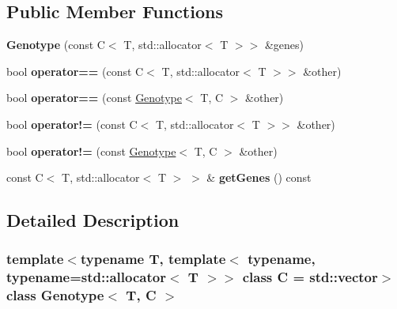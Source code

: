 \subsection*{Public Member Functions}
\begin{DoxyCompactItemize}
\item 
\hypertarget{classGenotype_aa017324ebf3698c5f109df27abbaae2a}{{\bfseries Genotype} (const C$<$ T, std\+::allocator$<$ T $>$$>$ \&genes)}\label{classGenotype_aa017324ebf3698c5f109df27abbaae2a}

\item 
\hypertarget{classGenotype_a3d872d4a917e96ea0431485f4458425f}{bool {\bfseries operator==} (const C$<$ T, std\+::allocator$<$ T $>$$>$ \&other)}\label{classGenotype_a3d872d4a917e96ea0431485f4458425f}

\item 
\hypertarget{classGenotype_a7267d1197bc6c9204b0076d82d2704c5}{bool {\bfseries operator==} (const \hyperlink{classGenotype}{Genotype}$<$ T, C $>$ \&other)}\label{classGenotype_a7267d1197bc6c9204b0076d82d2704c5}

\item 
\hypertarget{classGenotype_a6d3c7191139cc7921788869aa1b8d5ec}{bool {\bfseries operator!=} (const C$<$ T, std\+::allocator$<$ T $>$$>$ \&other)}\label{classGenotype_a6d3c7191139cc7921788869aa1b8d5ec}

\item 
\hypertarget{classGenotype_abf2058ffdeef37f5cc1defdc246d98ab}{bool {\bfseries operator!=} (const \hyperlink{classGenotype}{Genotype}$<$ T, C $>$ \&other)}\label{classGenotype_abf2058ffdeef37f5cc1defdc246d98ab}

\item 
\hypertarget{classGenotype_ab1b04f43ea5dbc620eef2754cb26aecf}{const C$<$ T, std\+::allocator$<$ T $>$ $>$ \& {\bfseries get\+Genes} () const }\label{classGenotype_ab1b04f43ea5dbc620eef2754cb26aecf}

\end{DoxyCompactItemize}


\subsection{Detailed Description}
\subsubsection*{template$<$typename T, template$<$ typename, typename=std\+::allocator$<$ T $>$$>$ class C = std\+::vector$>$class Genotype$<$ T, C $>$}

